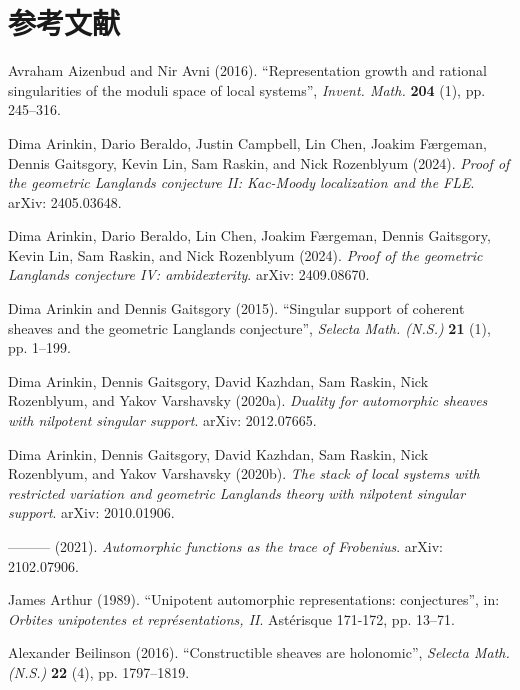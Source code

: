 \section*{参考文献}

\begin{list}{}{\setlength{\leftmargin}{2em}\setlength{\itemindent}{-2em}\setlength{\labelwidth}{0pt}\setlength{\labelsep}{0pt}\setlength{\itemsep}{0.3em}\setlength{\parsep}{0pt}\setlength{\topsep}{0.4em}}

\item Avraham Aizenbud and Nir Avni (2016). “Representation growth and rational singularities of the moduli space of local systems”, \textit{Invent. Math.} \textbf{204} (1), pp. 245–316.
\item Dima Arinkin, Dario Beraldo, Justin Campbell, Lin Chen, Joakim Færgeman, Dennis Gaitsgory, Kevin Lin, Sam Raskin, and Nick Rozenblyum (2024). \textit{Proof of the geometric Langlands conjecture II: Kac-Moody localization and the FLE}. arXiv: 2405.03648.
\item Dima Arinkin, Dario Beraldo, Lin Chen, Joakim Færgeman, Dennis Gaitsgory, Kevin Lin, Sam Raskin, and Nick Rozenblyum (2024). \textit{Proof of the geometric Langlands conjecture IV: ambidexterity}. arXiv: 2409.08670.
\item Dima Arinkin and Dennis Gaitsgory (2015). “Singular support of coherent sheaves and the geometric Langlands conjecture”, \textit{Selecta Math. (N.S.)} \textbf{21} (1), pp. 1–199.
\item Dima Arinkin, Dennis Gaitsgory, David Kazhdan, Sam Raskin, Nick Rozenblyum, and Yakov Varshavsky (2020a). \textit{Duality for automorphic sheaves with nilpotent singular support}. arXiv: 2012.07665.
\item Dima Arinkin, Dennis Gaitsgory, David Kazhdan, Sam Raskin, Nick Rozenblyum, and Yakov Varshavsky (2020b). \textit{The stack of local systems with restricted variation and geometric Langlands theory with nilpotent singular support}. arXiv: 2010.01906.
\item ——— (2021). \textit{Automorphic functions as the trace of Frobenius}. arXiv: 2102.07906.
\item James Arthur (1989). “Unipotent automorphic representations: conjectures”, in: \textit{Orbites unipotentes et représentations, II}. Astérisque 171-172, pp. 13–71.
\item Alexander Beilinson (2016). “Constructible sheaves are holonomic”, \textit{Selecta Math. (N.S.)} \textbf{22} (4), pp. 1797–1819.

\end{list}
